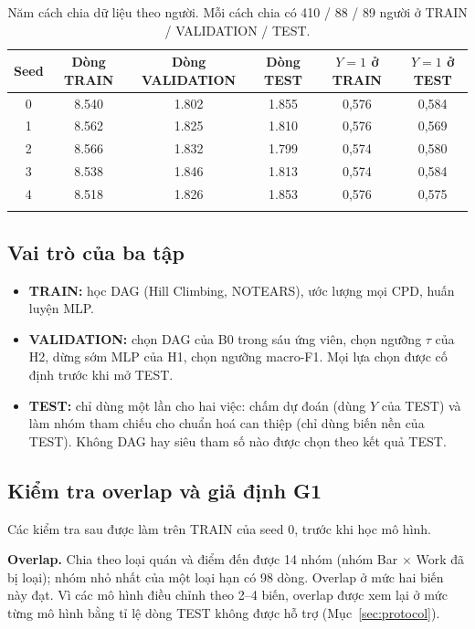 \documentclass[pdflatex,sn-mathphys-num]{sn-jnl}%
\begin{document}
\begin{table}[t]
\caption{Năm cách chia dữ liệu theo người. Mỗi cách chia có 410 / 88 / 89 người ở TRAIN / VALIDATION / TEST.}\label{tab:splits}
\begin{tabular}{@{}cccccc@{}}
\toprule
Seed & Dòng TRAIN & Dòng VALIDATION & Dòng TEST & $Y{=}1$ ở TRAIN & $Y{=}1$ ở TEST \\
\midrule
0 & 8.540 & 1.802 & 1.855 & 0,576 & 0,584 \\
1 & 8.562 & 1.825 & 1.810 & 0,576 & 0,569 \\
2 & 8.566 & 1.832 & 1.799 & 0,574 & 0,580 \\
3 & 8.538 & 1.846 & 1.813 & 0,574 & 0,584 \\
4 & 8.518 & 1.826 & 1.853 & 0,576 & 0,575 \\
\botrule
\end{tabular}
\end{table}

\subsection{Vai trò của ba tập}

\begin{itemize}
\item \textbf{TRAIN:} học DAG (Hill Climbing, NOTEARS), ước lượng mọi CPD, huấn luyện MLP.
\item \textbf{VALIDATION:} chọn DAG của B0 trong sáu ứng viên, chọn ngưỡng $\tau$ của H2, dừng sớm MLP của H1, chọn ngưỡng macro-F1. Mọi lựa chọn được cố định trước khi mở TEST.
\item \textbf{TEST:} chỉ dùng một lần cho hai việc: chấm dự đoán (dùng $Y$ của TEST) và làm nhóm tham chiếu cho chuẩn hoá can thiệp (chỉ dùng biến nền của TEST). Không DAG hay siêu tham số nào được chọn theo kết quả TEST.
\end{itemize}

\subsection{Kiểm tra overlap và giả định G1}\label{sec:overlap}

Các kiểm tra sau được làm trên TRAIN của seed 0, trước khi học mô hình.

\textbf{Overlap.} Chia theo loại quán và điểm đến được 14 nhóm (nhóm Bar $\times$ Work đã bị loại); nhóm nhỏ nhất của một loại hạn có 98 dòng. Overlap ở mức hai biến này đạt. Vì các mô hình điều chỉnh theo 2--4 biến, overlap được xem lại ở mức từng mô hình bằng tỉ lệ dòng TEST không được hỗ trợ (Mục~\ref{sec:protocol}).
\end{document}
